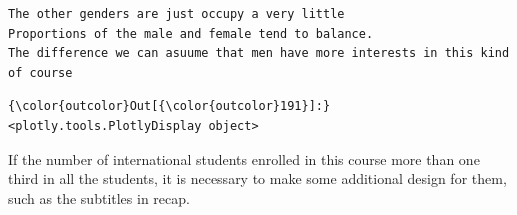 \documentclass[11pt]{article}
\begin{document}
    \begin{Verbatim}[commandchars=\\\{\}]
The other genders are just occupy a very little
Proportions of the male and female tend to balance.
The difference we can asuume that men have more interests in this kind of course

    \end{Verbatim}

\begin{Verbatim}[commandchars=\\\{\}]
{\color{outcolor}Out[{\color{outcolor}191}]:} <plotly.tools.PlotlyDisplay object>
\end{Verbatim}
            
    If the number of international students enrolled in this course more
than one third in all the students, it is necessary to make some
additional design for them, such as the subtitles in recap.
\end{document}
